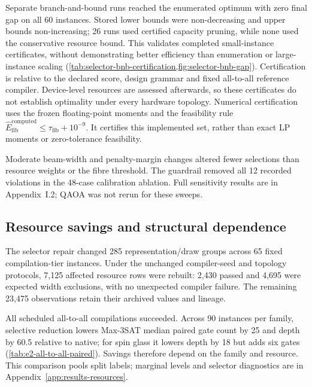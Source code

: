 \documentclass[a4paper,onecolumn,11pt,unpublished]{quantumarticle}
\theoremstyle{remark}
\begin{document}
Separate branch-and-bound runs reached the enumerated optimum with zero
final gap on all 60 instances. Stored lower bounds were non-decreasing and
upper bounds non-increasing; 26 runs used certified capacity pruning, while
none used the conservative resource bound. This validates completed
small-instance certificates, without demonstrating better efficiency than
enumeration or large-instance scaling
(\cref{tab:selector-bnb-certification,fig:selector-bnb-gap}).
Certification is relative to the declared score, design grammar and fixed
all-to-all reference compiler. Device-level resources are assessed
afterwards, so these certificates do not establish optimality under every
hardware topology. Numerical certification uses the frozen floating-point moments
and the feasibility rule
$\widehat E_{\mathrm{fib}}^{\mathrm{computed}}\leq\tau_{\mathrm{fib}}+10^{-9}$.
It certifies this implemented set, rather than exact LP moments or zero-tolerance
feasibility.

Moderate beam-width and penalty-margin changes altered fewer selections
than resource weights or the fibre threshold. The guardrail removed all 12
recorded violations in the 48-case calibration ablation. Full sensitivity
results are in Appendix~I.2; QAOA was not rerun for
these sweeps.

\subsection{Resource savings and structural dependence}
\label{sec:results-resources}
\label{sec:results-regimes}

The selector repair changed 285 representation/draw groups across 65 fixed
compilation-tier instances. Under the unchanged compiler-seed and topology
protocols, 7,125 affected resource rows were rebuilt: 2,430 passed and 4,695
were expected width exclusions, with no unexpected compiler failure. The
remaining 23,475 observations retain their archived values and lineage.

All scheduled all-to-all compilations succeeded. Across 90 instances per
family, selective reduction lowers Max-3SAT median paired gate count by 25
and depth by 60.5 relative to native; for spin glass it lowers depth by 18
but adds six gates (\cref{tab:e2-all-to-all-paired}). Savings therefore
depend on the family and resource. This comparison pools split labels;
marginal levels and selector diagnostics are in
Appendix~\ref{app:results-resources}.
\end{document}
